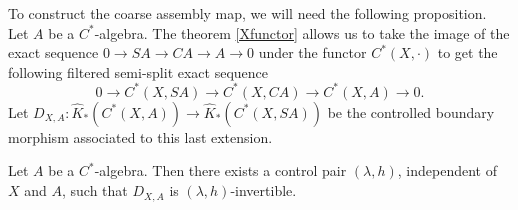 
To construct the coarse assembly map, we will need the following proposition.\\
 
Let $A$ be a $C^*$-algebra. The theorem \ref{Xfunctor} allows us to take the image of the exact sequence $0 \rightarrow SA \rightarrow CA \rightarrow A \rightarrow 0 $ under the functor $C^*(X,\cdot)$ to get the following filtered semi-split exact sequence 
\[0 \rightarrow C^*(X,SA) \rightarrow C^*(X,CA) \rightarrow C^*(X,A) \rightarrow 0.\] 
Let $D_{X,A} : \hat K_*(C^*(X,A))\rightarrow \hat K_*(C^*(X,SA))$ be the controlled boundary morphism associated to this last extension.

\begin{prop}\label{InverseEven}
Let $A$ be a $C^*$-algebra. 
Then there exists a control pair $(\lambda,h)$, independent of $X$ and $A$, such that $D_{X,A}$ is $(\lambda,h)$-invertible.
\end{prop}

